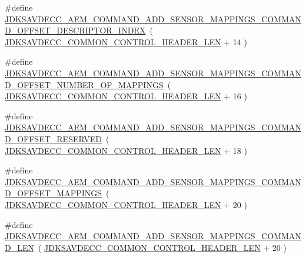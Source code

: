 \begin{DoxyCompactItemize}
\item 
\#define \hyperlink{group__command__add__sensor__mappings_ga4896a96445748bbd150f394b9ba660c3}{J\+D\+K\+S\+A\+V\+D\+E\+C\+C\+\_\+\+A\+E\+M\+\_\+\+C\+O\+M\+M\+A\+N\+D\+\_\+\+A\+D\+D\+\_\+\+S\+E\+N\+S\+O\+R\+\_\+\+M\+A\+P\+P\+I\+N\+G\+S\+\_\+\+C\+O\+M\+M\+A\+N\+D\+\_\+\+O\+F\+F\+S\+E\+T\+\_\+\+D\+E\+S\+C\+R\+I\+P\+T\+O\+R\+\_\+\+I\+N\+D\+EX}~( \hyperlink{group__jdksavdecc__avtp__common__control__header_gaae84052886fb1bb42f3bc5f85b741dff}{J\+D\+K\+S\+A\+V\+D\+E\+C\+C\+\_\+\+C\+O\+M\+M\+O\+N\+\_\+\+C\+O\+N\+T\+R\+O\+L\+\_\+\+H\+E\+A\+D\+E\+R\+\_\+\+L\+EN} + 14 )
\item 
\#define \hyperlink{group__command__add__sensor__mappings_gaa46f9d135718b41fdfcdb2705f2a4b39}{J\+D\+K\+S\+A\+V\+D\+E\+C\+C\+\_\+\+A\+E\+M\+\_\+\+C\+O\+M\+M\+A\+N\+D\+\_\+\+A\+D\+D\+\_\+\+S\+E\+N\+S\+O\+R\+\_\+\+M\+A\+P\+P\+I\+N\+G\+S\+\_\+\+C\+O\+M\+M\+A\+N\+D\+\_\+\+O\+F\+F\+S\+E\+T\+\_\+\+N\+U\+M\+B\+E\+R\+\_\+\+O\+F\+\_\+\+M\+A\+P\+P\+I\+N\+GS}~( \hyperlink{group__jdksavdecc__avtp__common__control__header_gaae84052886fb1bb42f3bc5f85b741dff}{J\+D\+K\+S\+A\+V\+D\+E\+C\+C\+\_\+\+C\+O\+M\+M\+O\+N\+\_\+\+C\+O\+N\+T\+R\+O\+L\+\_\+\+H\+E\+A\+D\+E\+R\+\_\+\+L\+EN} + 16 )
\item 
\#define \hyperlink{group__command__add__sensor__mappings_gaba15b06f79d3cb2bf49c20385e0d4544}{J\+D\+K\+S\+A\+V\+D\+E\+C\+C\+\_\+\+A\+E\+M\+\_\+\+C\+O\+M\+M\+A\+N\+D\+\_\+\+A\+D\+D\+\_\+\+S\+E\+N\+S\+O\+R\+\_\+\+M\+A\+P\+P\+I\+N\+G\+S\+\_\+\+C\+O\+M\+M\+A\+N\+D\+\_\+\+O\+F\+F\+S\+E\+T\+\_\+\+R\+E\+S\+E\+R\+V\+ED}~( \hyperlink{group__jdksavdecc__avtp__common__control__header_gaae84052886fb1bb42f3bc5f85b741dff}{J\+D\+K\+S\+A\+V\+D\+E\+C\+C\+\_\+\+C\+O\+M\+M\+O\+N\+\_\+\+C\+O\+N\+T\+R\+O\+L\+\_\+\+H\+E\+A\+D\+E\+R\+\_\+\+L\+EN} + 18 )
\item 
\#define \hyperlink{group__command__add__sensor__mappings_ga75cd6d75b86e8b8b83d70bff04f40f15}{J\+D\+K\+S\+A\+V\+D\+E\+C\+C\+\_\+\+A\+E\+M\+\_\+\+C\+O\+M\+M\+A\+N\+D\+\_\+\+A\+D\+D\+\_\+\+S\+E\+N\+S\+O\+R\+\_\+\+M\+A\+P\+P\+I\+N\+G\+S\+\_\+\+C\+O\+M\+M\+A\+N\+D\+\_\+\+O\+F\+F\+S\+E\+T\+\_\+\+M\+A\+P\+P\+I\+N\+GS}~( \hyperlink{group__jdksavdecc__avtp__common__control__header_gaae84052886fb1bb42f3bc5f85b741dff}{J\+D\+K\+S\+A\+V\+D\+E\+C\+C\+\_\+\+C\+O\+M\+M\+O\+N\+\_\+\+C\+O\+N\+T\+R\+O\+L\+\_\+\+H\+E\+A\+D\+E\+R\+\_\+\+L\+EN} + 20 )
\item 
\#define \hyperlink{group__command__add__sensor__mappings_ga5a37f5aa537b720fede13329f6c07d58}{J\+D\+K\+S\+A\+V\+D\+E\+C\+C\+\_\+\+A\+E\+M\+\_\+\+C\+O\+M\+M\+A\+N\+D\+\_\+\+A\+D\+D\+\_\+\+S\+E\+N\+S\+O\+R\+\_\+\+M\+A\+P\+P\+I\+N\+G\+S\+\_\+\+C\+O\+M\+M\+A\+N\+D\+\_\+\+L\+EN}~( \hyperlink{group__jdksavdecc__avtp__common__control__header_gaae84052886fb1bb42f3bc5f85b741dff}{J\+D\+K\+S\+A\+V\+D\+E\+C\+C\+\_\+\+C\+O\+M\+M\+O\+N\+\_\+\+C\+O\+N\+T\+R\+O\+L\+\_\+\+H\+E\+A\+D\+E\+R\+\_\+\+L\+EN} + 20 )
\end{DoxyCompactItemize}
